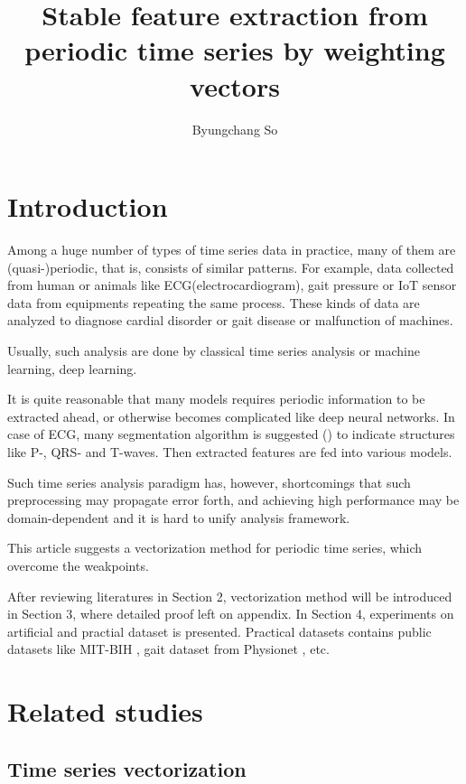 \documentclass{article}
\title{Stable feature extraction from periodic time series by weighting vectors}
\author{Byungchang So}
\begin{document}
\maketitle

\section{Introduction}

Among a huge number of types of time series data in practice, many of them are (quasi-)periodic, that is, consists of similar patterns. 
For example, data collected from human or animals like ECG(electrocardiogram), gait pressure or IoT sensor data from equipments repeating the same process. 
These kinds of data are analyzed to diagnose cardial disorder or gait disease or malfunction of machines.

Usually, such analysis are done by classical time series analysis or machine learning, deep learning. 

It is quite reasonable that many models requires periodic information to be extracted ahead, or otherwise becomes complicated like deep neural networks. 
In case of ECG, many segmentation algorithm is suggested (\cite{Pan1985}) to indicate structures like P-, QRS- and T-waves. 
Then extracted features are fed into various models. \cite{Liu2022}

Such time series analysis paradigm has, however, shortcomings that such preprocessing may propagate error forth, and achieving high performance may be domain-dependent and it is hard to unify analysis framework.

This article suggests a vectorization method for periodic time series, which overcome the weakpoints. 

After reviewing literatures in Section 2, vectorization method will be introduced in Section 3, where detailed proof left on appendix. 
In Section 4, experiments on artificial and practial dataset is presented. 
Practical datasets contains public datasets like MIT-BIH \cite{MIT-BIH}, gait dataset \cite{gait} from Physionet \cite{Physionet}, etc.


\section{Related studies}

\subsection{Time series vectorization}
\end{document}

